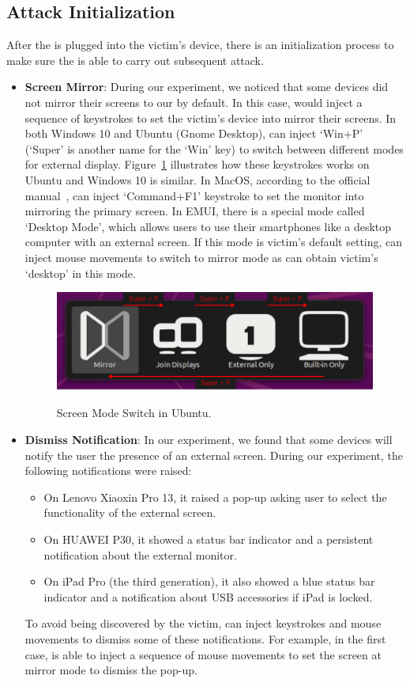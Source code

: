 \subsection{Attack Initialization}
\label{subsec:attack_init}
After the \tool is plugged into the victim's device, there is an initialization process to make sure the \tool is able to carry out subsequent attack.
\begin{itemize}
	\item \textbf{Screen Mirror}:
		During our experiment, we noticed that some devices did not mirror their screens to our \tool by default. In this case, \tool would inject a sequence of keystrokes to set the victim's device into mirror their screens. In both Windows 10 and Ubuntu (Gnome Desktop), \tool can inject `Win+P' (`Super' is another name for the `Win' key) to switch between different modes for external display. Figure~\ref{fig:ubuntu_switch} illustrates how these keystrokes works on Ubuntu and Windows 10 is similar. In MacOS, according to the official manual~\cite{appleman}, \tool can inject \mbox{`Command+F1'} keystroke to set the monitor into mirroring the primary screen. In EMUI, there is a special mode called `Desktop Mode', which allows users to use their smartphones like a desktop computer with an external screen. If this mode is victim's default setting, \tool can inject mouse movements to switch to mirror mode as \tool can obtain victim's `desktop' in this mode.
		\begin{figure}[H]
			\includegraphics[width=\linewidth]{./Figs/ubuntu_switch.png}\\
			\caption{Screen Mode Switch in Ubuntu.}
			\label{fig:ubuntu_switch}
		\end{figure}
	\item \textbf{Dismiss Notification}:
		In our experiment, we found that some devices will notify the user the presence of an external screen. During our experiment, the following notifications were raised:
		\begin{itemize}
		 \item On Lenovo Xiaoxin Pro 13, it raised a pop-up asking user to select the functionality of the external screen.
		 \item On HUAWEI P30, it showed a status bar indicator and a persistent notification about the external monitor.
		 \item On iPad Pro (the third generation), it also showed a blue status bar indicator and a notification about \ac{USB} accessories if iPad is locked.
		\end{itemize}
		To avoid being discovered by the victim, \tool can inject keystrokes and mouse movements to dismiss some of these notifications. For example, in the first case, \tool is able to inject a sequence of mouse movements to set the screen at mirror mode to dismiss the pop-up.
\end{itemize}
